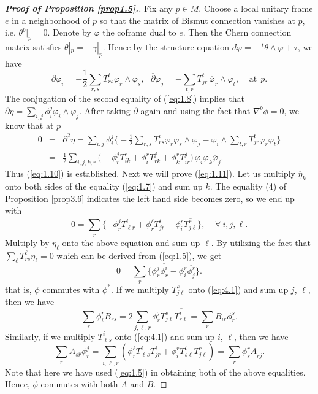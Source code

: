 \documentclass{amsart}
\numberwithin{equation}{section}
\theoremstyle{definition}
\renewcommand{\1}{\mathds{1}}
\renewcommand{\>}{\rightarrow}
\begin{document}
\begin{proof}[{\bf Proof of Proposition \ref{prop1.5}.}]
Fix any $p\in M$. Choose a local unitary frame $e$ in a neighborhood of $p$
so that the matrix of Bismut connection vanishes at $p$, i.e. $\theta^b|_p=0$.
Denote by $\varphi$ the coframe dual to $e$. Then the Chern connection matrix satisfies $\theta|_p=-\gamma|_p$.
Hence by the structure equation
$ d\varphi = - \,^t\!\theta \wedge \varphi +\tau$, we have
$$ \partial \varphi_i = -\frac{1}{2}\sum_{r,s}T^i_{rs}\varphi_r \wedge \varphi_s, \ \ \ \overline{\partial}\varphi_j = - \sum_{t,r} \overline{T^t_{jr}} \, \overline{\varphi}_r \wedge \varphi_t, \ \ \ \ \ \mbox{at} \ \ p. $$
The conjugation of the second equality of (\ref{eq:1.8}) implies that $\partial \overline{\eta} = \sum_{i,j} \phi^j_i \varphi_i \wedge \overline{\varphi}_j$. After taking $\partial $ again and using the fact that $\nabla^b\phi =0$, we know that at $p$
\begin{eqnarray*}
 0 & = &  \partial^2\overline{\eta} = \sum_{i,j} \phi^j_i \big\{ -\frac{1}{2}\sum_{r,s} T^i_{rs} \varphi_r\varphi_s \wedge \overline{\varphi}_j - \varphi_i \wedge  \sum_{t,r} T^t_{jr} \varphi_r \overline{\varphi}_t \big\} \\
 & = & \frac{1}{2} \sum_{i,j,k,r} \big( - \phi^j_r T^r_{ik} + \phi^r_i T^j_{rk} + \phi^r_k T^j_{ir} \big) \,\varphi_i\varphi_k\overline{\varphi}_j .
\end{eqnarray*}
Thus (\ref{eq:1.10}) is established. Next we will prove (\ref{eq:1.11}).
Let us multiply $\overline{\eta}_k$ onto both sides of the equality (\ref{eq:1.7}) and sum up $k$.
The equality (4) of Proposition \ref{prop3.6} indicates the left hand side becomes zero, so we end up with
\begin{equation} \label{eq:4.1}
 0 = \sum_r \{ -\phi^j_r \overline{T^i_{\ell r}} + \phi^{\ell }_r \overline{T^i_{j r}}  - \phi^r_i \overline{T^r_{j\ell }}  \} , \ \ \ \ \ \forall \ i,j,\ell.
 \end{equation}
Multiply by $\eta_{\ell}$ onto the above equation and sum up $\ell$.
By utilizing the fact that $\sum_{\ell} T^{\ell}_{rs}\eta_{\ell} =0$ which can be derived from (\ref{eq:1.5}), we get
$$ 0 = \sum_r \{ \phi^j_r \overline{\phi^i_r } - \phi^r_i \overline{\phi^r_j } \} .$$
that is, $\phi$ commutes with $\phi^{\ast}$. If we multiply $T^s_{j\ell }$ onto (\ref{eq:4.1}) and sum up $j$, $\ell$,
then we have \[\sum_r \phi_i^r B_{r\bar{s}} = 2 \sum_{j,\ell,r} \phi^j_r T^s_{j \ell} \overline{T^i_{r \ell}}
=\sum_{r} B_{i\bar{r}} \phi_r^s.\]
Similarly, if we multiply $T^i_{\ell s}$ onto (\ref{eq:4.1}) and sum up $i$, $\ell$, then we have
\[\sum_r A_{s\bar{r}}\phi_r^j
=\sum_{i,\ell,r}(\phi^{\ell}_r T^i_{\ell s} \overline{T^i_{jr}} + \phi_i^r T^i_{s \ell}\overline{T^r_{j \ell}})
=\sum_r \phi_s^r A_{r \bar{j}}.\]
Note that here we have used (\ref{eq:1.5}) in obtaining  both of the above equalities. Hence, $\phi$ commutes with both $A$ and $B$.


\end{proof}
\end{document}
